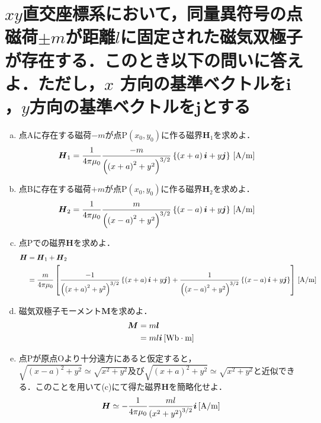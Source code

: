 \documentclass[dvipdfmx]{ujarticle}
\begin{document}
\section{$xy$直交座標系において，同量異符号の点磁荷$\pm m$が距離$l$に固定された磁気双極子が存在する．このとき以下の問いに答えよ．ただし，$x$ 方向の基準ベクトルを$\boldsymbol{i}$，$y$方向の基準ベクトルを$\boldsymbol{j}$とする}
\begin{enumerate}[(a)]
	\item 点Aに存在する磁荷$-m$が点P$(x_0,y_0)$に作る磁界$\boldsymbol{H}_{1}$を求めよ．
	\begin{align*}
		\boldsymbol{H}_{1}&=\frac{1}{4\pi \mu_{0}}\frac{-m}{\left(\left(x+a\right)^{2}+y^{2}\right)^{3/2}} \left\{ \left(x+a\right)\boldsymbol{i}+y\boldsymbol{j}\right\}\,[\rm{A/m}]
	\end{align*}
	\item 点Bに存在する磁荷$+m$が点P$(x_0,y_0)$に作る磁界$\boldsymbol{H}_{2}$を求めよ．
	\begin{align*}
		\boldsymbol{H}_{2}&=\frac{1}{4\pi \mu_{0}}\frac{m}{\left(\left(x-a\right)^{2}+y^{2}\right)^{3/2}} \left\{ \left(x-a\right)\boldsymbol{i}+y\boldsymbol{j}\right\}\,[\rm{A/m}]
	\end{align*}
	\item 点Pでの磁界$\boldsymbol{H}$を求めよ．
	\begin{align*}
		\boldsymbol{H}&=\boldsymbol{H}_{1}+\boldsymbol{H}_{2}\\
		&=\frac{m}{4\pi \mu_{0}}\left[\frac{-1}{\left(\left(x+a\right)^{2}+y^{2}\right)^{3/2}} \left\{ \left(x+a\right)\boldsymbol{i}+y\boldsymbol{j}\right\}+\frac{1}{\left(\left(x-a\right)^{2}+y^{2}\right)^{3/2}} \left\{ \left(x-a\right)\boldsymbol{i}+y\boldsymbol{j}\right\}\right]\,[\rm{A/m}]
	\end{align*}
	\item 磁気双極子モーメント$\boldsymbol{M}$を求めよ．
	\begin{align*}
		\boldsymbol{M}&=m\boldsymbol{l}\\
		&=ml\boldsymbol{i}\,[\rm{Wb\cdot m}]
	\end{align*}
	\item 点Pが原点Oより十分遠方にあると仮定すると，$\sqrt{(x-a)^{2}+y^{2}}\simeq \sqrt{x^{2}+y^{2}}$及び$\sqrt{(x+a)^{2}+y^{2}}\simeq \sqrt{x^{2}+y^{2}}$と近似できる．このことを用いて(c)にて得た磁界$\boldsymbol{H}$を簡略化せよ．
	\begin{align*}
		\boldsymbol{H}&\simeq -\frac{1}{4\pi \mu_{0}}\frac{ml}{\left(x^{2}+y^{2}\right)^{3/2}} \boldsymbol{i}\,[\rm{A/m}]\\

\end{align*}
\end{enumerate}
\end{document}

